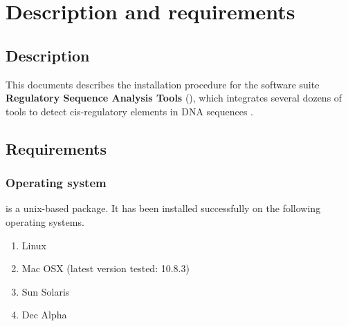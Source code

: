 \documentclass[12pt,a4paper, oneside]{scrreprt} %
\begin{document}


\newpage
\tableofcontents
\newpage

\chapter{Description and requirements}

\section{Description}

This documents describes the installation procedure for the software
suite \textbf{Regulatory Sequence Analysis Tools} (\RSAT), which
integrates several dozens of tools to detect cis-regulatory elements
in DNA sequences
\cite{Thomas-Chollier:2011:W86-91,Thomas-Chollier:2008:W119-27,vanHelden:2003:3593-6,vanHelden:2000:177-87}.

\section{Requirements}

\subsection{Operating system}

\RSAT is a unix-based package. It has been installed successfully on
the following operating systems.

\begin{enumerate}
\item Linux

\item Mac OSX (latest version tested: 10.8.3)

\item Sun Solaris

\item Dec Alpha

\end{enumerate}
\end{document}
